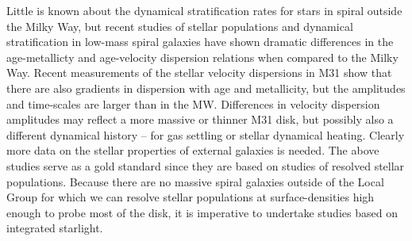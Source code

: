 Little is known about the dynamical stratification rates for stars in
spiral outside the Milky Way, but recent studies of stellar
populations and dynamical stratification in low-mass spiral galaxies
\citep{Seth05a,Bernard15} have shown dramatic differences in the
age-metallicty and age-velocity dispersion relations when compared to
the Milky Way. Recent measurements of the stellar velocity dispersions
in M31 \citep{Dorman15} show that there are also gradients in
dispersion with age and metallicity, but the amplitudes and
time-scales are larger than in the MW. Differences in velocity
dispersion amplitudes may reflect a more massive or thinner M31 disk,
but possibly also a different dynamical history -- for gas settling or
stellar dynamical heating. Clearly more data on the stellar properties
of external galaxies is needed. The above studies serve as a gold
standard since they are based on studies of resolved stellar
populations. Because there are no massive spiral galaxies outside of
the Local Group for which we can resolve stellar populations at
surface-densities high enough to probe most of the disk, it is
imperative to undertake studies based on integrated starlight.



